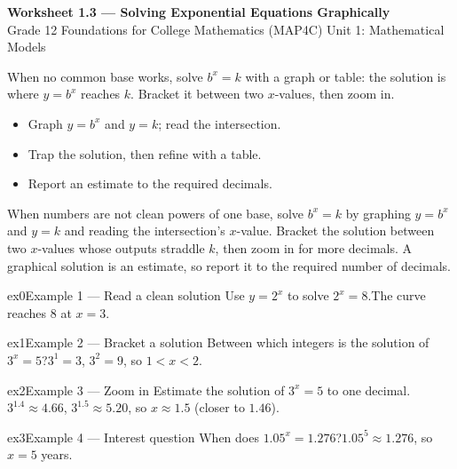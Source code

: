 \documentclass[11pt]{article}
\begin{document}
\begin{center}
{\LARGE\bfseries\color{titleblue}Worksheet 1.3 --- Solving Exponential Equations Graphically}\\[2pt]
{\small Grade 12 Foundations for College Mathematics (MAP4C) \textperiodcentered{} Unit 1: Mathematical Models}
\end{center}

\begin{ideabox}
When no common base works, solve $b^{x}=k$ with a graph or table: the solution is where $y=b^{x}$ reaches $k$. Bracket it between two $x$-values, then zoom in.
\begin{itemize}[leftmargin=*,itemsep=2pt]
  \item Graph $y=b^x$ and $y=k$; read the intersection.
  \item Trap the solution, then refine with a table.
  \item Report an estimate to the required decimals.
\end{itemize}
\end{ideabox}

\begin{learnbox}
When numbers are not clean powers of one base, solve $b^{x}=k$ by graphing $y=b^x$ and $y=k$ and reading the intersection's $x$-value.
Bracket the solution between two $x$-values whose outputs straddle $k$, then zoom in for more decimals.
A graphical solution is an estimate, so report it to the required number of decimals.
\end{learnbox}


\begin{example}{ex0}{Example 1 --- Read a clean solution}
Use $y=2^{x}$ to solve $2^{x}=8$.\soln The curve reaches $8$ at $x=3$.
\end{example}

\begin{example}{ex1}{Example 2 --- Bracket a solution}
Between which integers is the solution of $3^{x}=5$?\soln $3^1=3$, $3^2=9$, so $1<x<2$.
\end{example}

\begin{example}{ex2}{Example 3 --- Zoom in}
Estimate the solution of $3^{x}=5$ to one decimal.\soln $3^{1.4}\approx4.66$, $3^{1.5}\approx5.20$, so $x\approx1.5$ (closer to $1.46$).
\end{example}

\begin{example}{ex3}{Example 4 --- Interest question}
When does $1.05^{x}=1.276$?\soln $1.05^{5}\approx1.276$, so $x=5$ years.
\end{example}
\end{document}
